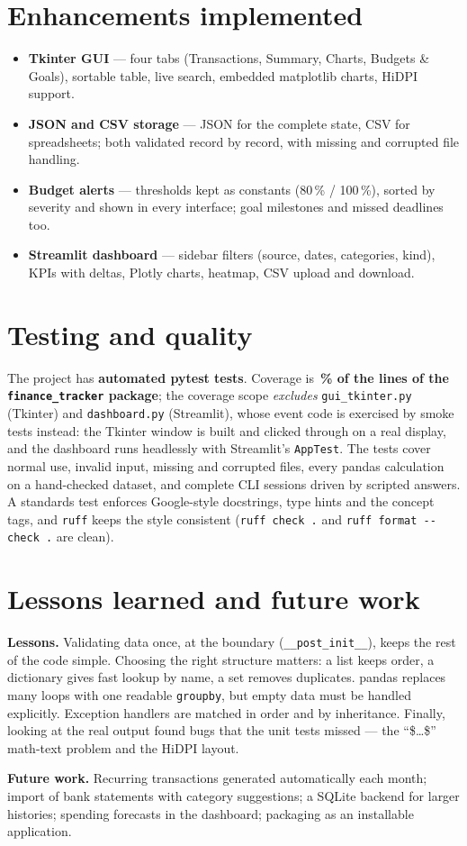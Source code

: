 \documentclass[11pt,letterpaper]{article}
\newcommand{\code}[1]{\texttt{#1}}
\begin{document}
\section{Enhancements implemented}
\begin{itemize}
  \item \textbf{Tkinter GUI} --- four tabs (Transactions, Summary, Charts, Budgets \&
        Goals), sortable table, live search, embedded matplotlib charts, HiDPI support.
  \item \textbf{JSON and CSV storage} --- JSON for the complete state, CSV for spreadsheets;
        both validated record by record, with missing and corrupted file handling.
  \item \textbf{Budget alerts} --- thresholds kept as constants (80\,\% / 100\,\%), sorted by
        severity and shown in every interface; goal milestones and missed deadlines too.
  \item \textbf{Streamlit dashboard} --- sidebar filters (source, dates, categories, kind),
        KPIs with deltas, Plotly charts, heatmap, CSV upload and download.
\end{itemize}

\section{Testing and quality}
The project has \textbf{\TestCount{} automated pytest tests}. Coverage is
\textbf{\CoveragePct\,\% of the lines of the \code{finance\_tracker} package}; the coverage
scope \emph{excludes} \code{gui\_tkinter.py} (Tkinter) and \code{dashboard.py}
(Streamlit), whose event code is exercised by smoke tests instead: the Tkinter window is
built and clicked through on a real display, and the dashboard runs headlessly with
Streamlit's \code{AppTest}. The tests cover normal use, invalid input, missing and corrupted
files, every pandas calculation on a hand-checked dataset, and complete CLI sessions driven
by scripted answers. A standards test enforces Google-style docstrings, type hints and the
concept tags, and \code{ruff} keeps the style consistent (\code{ruff check .} and
\code{ruff format -{}-check .} are clean).

\section{Lessons learned and future work}
\textbf{Lessons.} Validating data once, at the boundary (\code{\_\_post\_init\_\_}), keeps
the rest of the code simple. Choosing the right structure matters: a list keeps order, a
dictionary gives fast lookup by name, a set removes duplicates. pandas replaces many loops
with one readable \code{groupby}, but empty data must be handled explicitly. Exception
handlers are matched in order and by inheritance. Finally, looking at the real output found
bugs that the unit tests missed --- the ``\$\dots\$'' math-text problem and the HiDPI layout.

\textbf{Future work.} Recurring transactions generated automatically each month; import of
bank statements with category suggestions; a SQLite backend for larger histories; spending
forecasts in the dashboard; packaging as an installable application.
\end{document}
